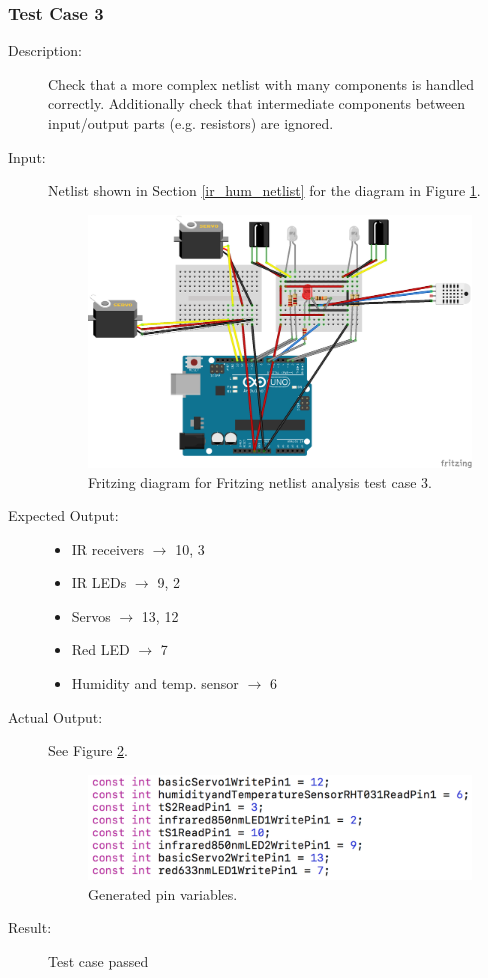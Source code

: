 \documentclass{UoYCSproject}
\begin{document}
\subsubsection{Test Case 3} \label{fritz_tc3}
\begin{description}
\item[Description:] Check that a more complex netlist with many components is handled correctly. Additionally check that intermediate components between input/output parts (e.g. resistors) are ignored.

\item[Input:] Netlist shown in Section \ref{ir_hum_netlist} for the diagram in Figure \ref{fig:ir_hum_diagram}.
\begin{figure}[h!]
  \centering
  \includegraphics[width=0.7\linewidth]{graphics/ir_humidity_sensors.png}
  \caption{Fritzing diagram for Fritzing netlist analysis test case 3.}
  \label{fig:ir_hum_diagram}
\end{figure}
\item[Expected Output:] 
\begin{itemize}
\item IR receivers $\rightarrow$ 10, 3
\item IR LEDs $\rightarrow$ 9, 2
\item Servos $\rightarrow$ 13, 12
\item Red LED $\rightarrow$ 7
\item Humidity and temp. sensor $\rightarrow$ 6
\end{itemize}
\item[Actual Output:] See Figure \ref{fig:ir_hum_out}.
\begin{figure}[h!]
  \centering
  \includegraphics[width=0.7\linewidth]{graphics/cs1_gen_pins.png}
  \caption{Generated pin variables.}
  \label{fig:ir_hum_out}
\end{figure}
\item[Result:] Test case passed
\end{description}
\end{document}
